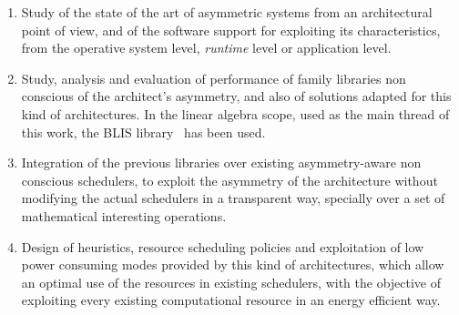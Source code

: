 \begin{enumerate}[T1.]

\item Study of the state of the art of asymmetric systems from an
  architectural point of view, and of the software support for exploiting
  its characteristics, from the operative system level, \emph{runtime}
  level or application level.

\item Study, analysis and evaluation of performance of family libraries non
  conscious of the architect's asymmetry, and also of solutions adapted for
  this kind of architectures. In the linear algebra scope, used as the main
  thread of this work, the BLIS library~\cite{BLIS1} has been used.

\item Integration of the previous libraries over existing asymmetry-aware
  non conscious schedulers, to exploit the asymmetry of the architecture
  without modifying the actual schedulers in a transparent way, specially
  over a set of mathematical interesting operations.

\item Design of heuristics, resource scheduling policies and exploitation
  of low power consuming modes provided by this kind of architectures,
  which allow an optimal use of the resources in existing schedulers, with
  the objective of exploiting every existing computational resource in an
  energy efficient way.
  

\end{enumerate}
